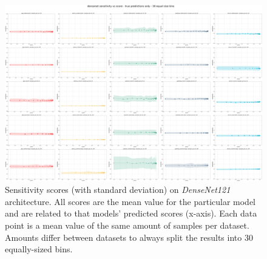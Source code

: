\begin{figure}[ht]
  \centering
    \includegraphics[width=\textwidth]{appendixes/images/densenet-sensitivity vs score - true predictions only - 30 equal size bins.png}
    \caption{Sensitivity scores (with standard deviation) on \textit{DenseNet121} architecture. All scores are the mean value for the particular model and are related to that models' predicted scores (x-axis). Each data point is a mean value of the same amount of samples per dataset. Amounts differ between datasets to always split the results into 30 equally-sized bins.}\label{fig:densenet-sens-std}
\end{figure}